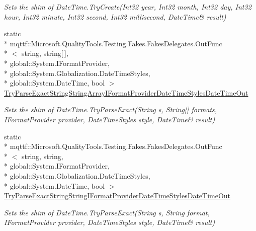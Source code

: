 \begin{DoxyCompactItemize}
\begin{DoxyCompactList}\small\item\em Sets the shim of Date\-Time.\-Try\-Create(Int32 year, Int32 month, Int32 day, Int32 hour, Int32 minute, Int32 second, Int32 millisecond, Date\-Time\& result)\end{DoxyCompactList}\item 
static \\*
mqttf\-::\-Microsoft.\-Quality\-Tools.\-Testing.\-Fakes.\-Fakes\-Delegates.\-Out\-Func\\*
$<$ string, string\mbox{[}$\,$\mbox{]}, \\*
global\-::\-System.\-I\-Format\-Provider, \\*
global\-::\-System.\-Globalization.\-Date\-Time\-Styles, \\*
global\-::\-System.\-Date\-Time, bool $>$ \hyperlink{class_system_1_1_fakes_1_1_shim_date_time_a834eccea488add551962181e6e46ccba}{Try\-Parse\-Exact\-String\-String\-Array\-I\-Format\-Provider\-Date\-Time\-Styles\-Date\-Time\-Out}
\begin{DoxyCompactList}\small\item\em Sets the shim of Date\-Time.\-Try\-Parse\-Exact(String s, String\mbox{[}\mbox{]} formats, I\-Format\-Provider provider, Date\-Time\-Styles style, Date\-Time\& result)\end{DoxyCompactList}\item 
static \\*
mqttf\-::\-Microsoft.\-Quality\-Tools.\-Testing.\-Fakes.\-Fakes\-Delegates.\-Out\-Func\\*
$<$ string, string, \\*
global\-::\-System.\-I\-Format\-Provider, \\*
global\-::\-System.\-Globalization.\-Date\-Time\-Styles, \\*
global\-::\-System.\-Date\-Time, bool $>$ \hyperlink{class_system_1_1_fakes_1_1_shim_date_time_a526312cd19828ac0a49a871283e732df}{Try\-Parse\-Exact\-String\-String\-I\-Format\-Provider\-Date\-Time\-Styles\-Date\-Time\-Out}
\begin{DoxyCompactList}\small\item\em Sets the shim of Date\-Time.\-Try\-Parse\-Exact(String s, String format, I\-Format\-Provider provider, Date\-Time\-Styles style, Date\-Time\& result)\end{DoxyCompactList}\item 

\end{DoxyCompactItemize}
